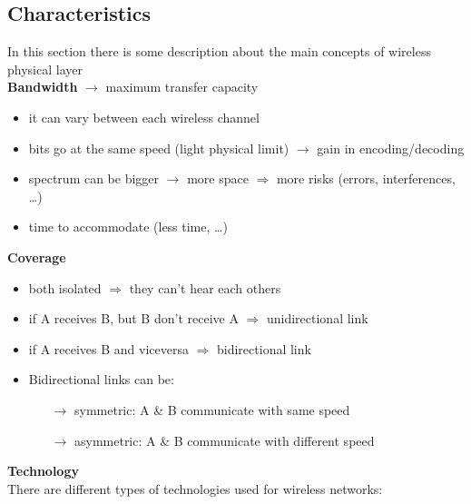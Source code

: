 \subsection{Characteristics}
In this section there is some description about the main concepts of wireless\\physical layer\\[0.5cm]
\textbf{Bandwidth} $\rightarrow$ maximum transfer capacity
\begin{itemize}
    \item it can vary between each wireless channel
    \item bits go at the same speed (light physical limit) $\rightarrow$
    gain in encoding/decoding
    \item spectrum can be bigger $\rightarrow$ more space $\Rightarrow$
    more risks (errors, interferences, \dots)
    \item time to accommodate (less time, \dots)
\end{itemize}
\vspace{1em}
\textbf{Coverage}
\begin{itemize}
    \item both isolated $\Rightarrow$ they can't hear each others
    \item if A receives B, but B don't receive A $\Rightarrow$ unidirectional link
    \item if A receives B and viceversa $\Rightarrow$ bidirectional link
    \item Bidirectional links can be:
    \begin{itemize}
        \item[$\rightarrow$] symmetric: A \& B communicate with same speed
        \item[$\rightarrow$] asymmetric: A \& B communicate with different speed
    \end{itemize}
\end{itemize}
\vspace{1em}
\textbf{Technology}\\[0.2cm]
There are different types of technologies used for wireless networks:
